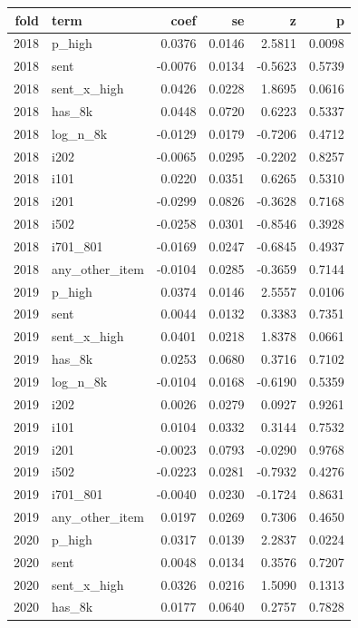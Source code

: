 \begin{tabular}{rlrrrr}
\toprule
fold & term & coef & se & z & p \\
\midrule
2018 & p\_high & 0.0376 & 0.0146 & 2.5811 & 0.0098 \\
2018 & sent & -0.0076 & 0.0134 & -0.5623 & 0.5739 \\
2018 & sent\_x\_high & 0.0426 & 0.0228 & 1.8695 & 0.0616 \\
2018 & has\_8k & 0.0448 & 0.0720 & 0.6223 & 0.5337 \\
2018 & log\_n\_8k & -0.0129 & 0.0179 & -0.7206 & 0.4712 \\
2018 & i202 & -0.0065 & 0.0295 & -0.2202 & 0.8257 \\
2018 & i101 & 0.0220 & 0.0351 & 0.6265 & 0.5310 \\
2018 & i201 & -0.0299 & 0.0826 & -0.3628 & 0.7168 \\
2018 & i502 & -0.0258 & 0.0301 & -0.8546 & 0.3928 \\
2018 & i701\_801 & -0.0169 & 0.0247 & -0.6845 & 0.4937 \\
2018 & any\_other\_item & -0.0104 & 0.0285 & -0.3659 & 0.7144 \\
2019 & p\_high & 0.0374 & 0.0146 & 2.5557 & 0.0106 \\
2019 & sent & 0.0044 & 0.0132 & 0.3383 & 0.7351 \\
2019 & sent\_x\_high & 0.0401 & 0.0218 & 1.8378 & 0.0661 \\
2019 & has\_8k & 0.0253 & 0.0680 & 0.3716 & 0.7102 \\
2019 & log\_n\_8k & -0.0104 & 0.0168 & -0.6190 & 0.5359 \\
2019 & i202 & 0.0026 & 0.0279 & 0.0927 & 0.9261 \\
2019 & i101 & 0.0104 & 0.0332 & 0.3144 & 0.7532 \\
2019 & i201 & -0.0023 & 0.0793 & -0.0290 & 0.9768 \\
2019 & i502 & -0.0223 & 0.0281 & -0.7932 & 0.4276 \\
2019 & i701\_801 & -0.0040 & 0.0230 & -0.1724 & 0.8631 \\
2019 & any\_other\_item & 0.0197 & 0.0269 & 0.7306 & 0.4650 \\
2020 & p\_high & 0.0317 & 0.0139 & 2.2837 & 0.0224 \\
2020 & sent & 0.0048 & 0.0134 & 0.3576 & 0.7207 \\
2020 & sent\_x\_high & 0.0326 & 0.0216 & 1.5090 & 0.1313 \\
2020 & has\_8k & 0.0177 & 0.0640 & 0.2757 & 0.7828 \\

\end{tabular}
